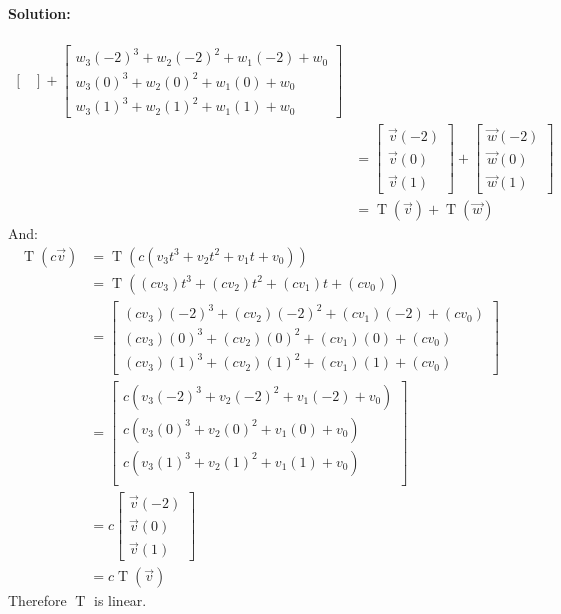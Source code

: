 \documentclass[12pt, letterpaper]{article}
\theoremstyle{statement}
\theoremstyle{statement}
\newenvironment{Solution}{\noindent\ignorespaces\paragraph{Solution:}}{\hfill \ding{122}\par\noindent}
\begin{document}
\begin{Solution}
\begin{align*}
\begin{bmatrix}
        \end{bmatrix}
        +
        \begin{bmatrix}
        w_3(-2)^3 + w_2(-2)^2 + w_1(-2) + w_0 \\
        w_3(0)^3 + w_2(0)^2 + w_1(0) + w_0 \\
        w_3(1)^3 + w_2(1)^2 + w_1(1) + w_0
        \end{bmatrix} \\
        &=
        \begin{bmatrix}
        \Vec{v}(-2) \\
        \Vec{v}(0)\\
        \Vec{v}(1)
        \end{bmatrix}
        +
        \begin{bmatrix}
        \Vec{w}(-2) \\
        \Vec{w}(0)\\
        \Vec{w}(1)
        \end{bmatrix} \\
        &= 
        \operatorname{T}(\Vec{v}) + \operatorname{T}(\Vec{w})
    \end{align*}
    And: 
    \begin{align*}
        \operatorname{T}(c\Vec{v}) &= \operatorname{T}(c(v_3t^3+v_2t^2+v_1t+v_0)) \\
        &= \operatorname{T}((cv_3)t^3 + (cv_2)t^2 + (cv_1)t + (cv_0)) \\
        &=
        \begin{bmatrix}
        (cv_3)(-2)^3 + (cv_2)(-2)^2 + (cv_1)(-2) + (cv_0) \\
        (cv_3)(0)^3 + (cv_2)(0)^2 + (cv_1)(0) + (cv_0) \\
        (cv_3)(1)^3 + (cv_2)(1)^2 + (cv_1)(1) + (cv_0)
        \end{bmatrix} \\ 
        &= 
        \begin{bmatrix}
        c (v_3(-2)^3 + v_2(-2)^2 + v_1(-2) + v_0) \\
        c (v_3(0)^3 + v_2(0)^2 + v_1(0) + v_0) \\
        c (v_3(1)^3 + v_2(1)^2 + v_1(1) + v_0) \\
        \end{bmatrix} \\
        &= 
        c
        \begin{bmatrix}
        \Vec{v}(-2) \\
        \Vec{v}(0) \\
        \Vec{v}(1)
        \end{bmatrix} \\
        &= 
        c\operatorname{T}(\Vec{v})
    \end{align*}
    Therefore $\operatorname{T}$ is linear. 
    

\end{Solution}
\end{document}

